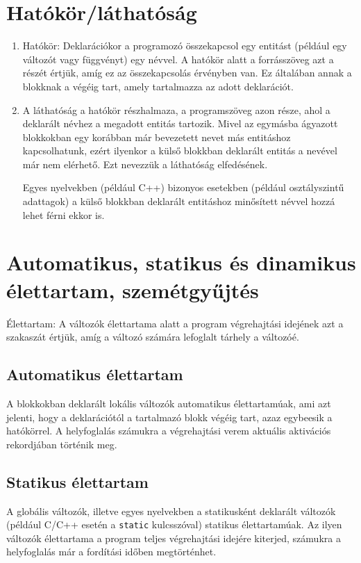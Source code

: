 \documentclass[margin=0px]{article}
\begin{document}
\section{Hatókör/láthatóság}

\begin{enumerate}
    \item	Hatókör: Deklarációkor a programozó összekapcsol egy entitást (például egy változót vagy függvényt) egy névvel. A hatókör alatt a forrásszöveg azt a részét értjük, amíg ez az összekapcsolás érvényben van. Ez általában annak a blokknak a végéig tart, amely tartalmazza az adott deklarációt.

    \item	A láthatóság a hatókör részhalmaza, a programszöveg azon része, ahol a deklarált névhez a megadott entitás tartozik. Mivel az egymásba ágyazott blokkokban egy korábban már bevezetett nevet más entitáshoz kapcsolhatunk, ezért ilyenkor a külső blokkban deklarált entitás a nevével már nem elérhető. Ezt nevezzük a láthatóság elfedésének.

          Egyes nyelvekben (például C++) bizonyos esetekben (például osztályszintű adattagok) a külső blokkban deklarált entitáshoz minősített névvel hozzá lehet férni ekkor is.
\end{enumerate}

\section{Automatikus, statikus és dinamikus élettartam, szemétgyűjtés}
Élettartam: A változók élettartama alatt a program végrehajtási idejének azt a szakaszát értjük, amíg a változó számára lefoglalt tárhely a változóé.

\subsection{Automatikus élettartam}

A blokkokban deklarált lokális változók automatikus élettartamúak, ami azt jelenti, hogy a deklarációtól a tartalmazó blokk végéig tart, azaz egybeesik a hatókörrel. A helyfoglalás számukra a végrehajtási verem aktuális aktivációs rekordjában történik meg.

\subsection{Statikus élettartam}

A globális változók, illetve egyes nyelvekben a statikusként deklarált változók (például C/C++ esetén a \texttt{static} kulcsszóval) statikus élettartamúak. Az ilyen változók élettartama a program teljes végrehajtási idejére kiterjed, számukra a helyfoglalás már a fordítási időben megtörténhet.
\end{document}
